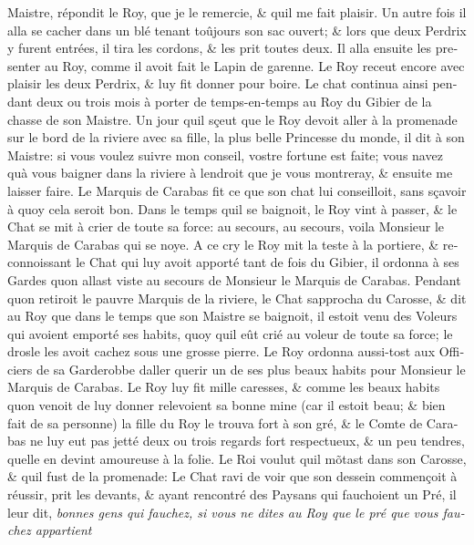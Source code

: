 \documentclass[14pt,a4paper]{memoir}
\begin{document}
\begin{otherlanguage}{french}
Maistre, répondit le Roy, que je le remercie, \& qu\textquotesingle il
me fait plaisir. Un autre fois il alla se cacher dans un blé tenant
toûjours son sac ouvert; \& lors que deux Perdrix y furent entrées, il
tira les cordons, \& les prit toutes deux. Il alla ensuite les presenter
au Roy, comme il avoit fait le Lapin de garenne. Le Roy receut encore
avec plaisir les deux Perdrix, \& luy fit donner pour boire. Le chat
continua ainsi pendant deux ou trois mois à porter de temps-en-temps au
Roy du Gibier de la chasse de son Maistre. Un jour qu\textquotesingle il
sçeut que le Roy devoit aller à la promenade sur le bord de la riviere
avec sa fille, la plus belle Princesse du monde, il dit à son Maistre:
si vous voulez suivre mon conseil, vostre fortune est faite; vous
n\textquotesingle avez qu\textquotesingle à vous baigner dans la riviere
à l\textquotesingle endroit que je vous montreray, \& ensuite me laisser
faire. Le Marquis de Carabas fit ce que son chat lui conseilloit, sans
sçavoir à quoy cela seroit bon. Dans le temps qu\textquotesingle il se
baignoit, le Roy vint à passer, \& le Chat se mit à crier de toute sa
force: au secours, au secours, voila Monsieur le Marquis de Carabas qui
se noye. A ce cry le Roy mit la teste à la portiere, \& reconnoissant le
Chat qui luy avoit apporté tant de fois du Gibier, il ordonna à ses
Gardes qu\textquotesingle on allast viste au secours de Monsieur le
Marquis de Carabas. Pendant qu\textquotesingle on retiroit le pauvre
Marquis de la riviere, le Chat s\textquotesingle approcha du Carosse, \&
dit au Roy que dans le temps que son Maistre se baignoit, il estoit venu
des Voleurs qui avoient emporté ses habits, quoy qu\textquotesingle il
eût crié au voleur de toute sa force; le drosle les avoit cachez sous
une grosse pierre. Le Roy ordonna aussi-tost aux Officiers de sa
Garderobbe d\textquotesingle aller querir un de ses plus beaux habits
pour Monsieur le Marquis de Carabas. Le Roy luy fit mille caresses, \&
comme les beaux habits qu\textquotesingle on venoit de luy donner
relevoient sa bonne mine (car il estoit beau; \& bien fait de sa
personne) la fille du Roy le trouva fort à son gré, \& le Comte de
Carabas ne luy eut pas jetté deux ou trois regards fort respectueux, \&
un peu tendres, qu\textquotesingle elle en devint amoureuse à la folie.
Le Roi voulut qu\textquotesingle il mõtast dans son Carosse, \&
qu\textquotesingle il fust de la promenade: Le Chat ravi de voir que son
dessein commençoit à réussir, prit les devants, \& ayant rencontré des
Paysans qui fauchoient un Pré, il leur dit, \emph{bonnes gens qui
fauchez, si vous ne dites au Roy que le pré que vous fauchez appartient
}
\end{otherlanguage}
\end{document}
